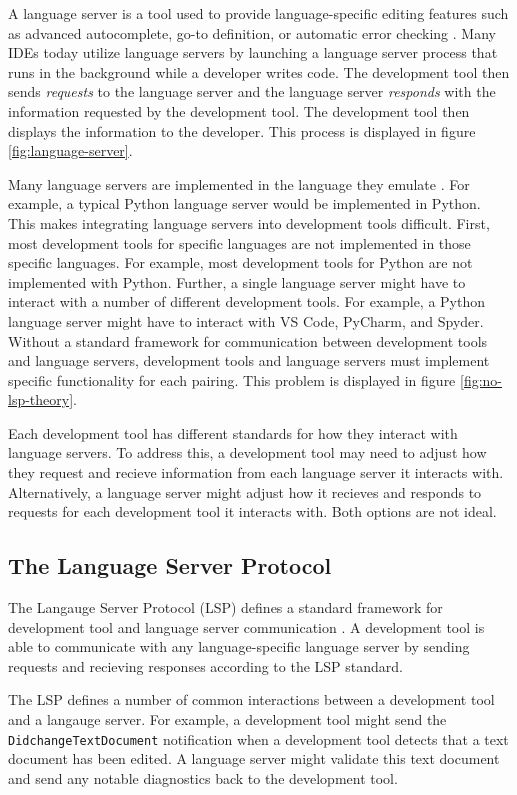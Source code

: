 \documentclass{article}
\begin{document}
A language server is a tool used to provide language-specific editing features such as advanced autocomplete, go-to definition, or automatic error checking \cite{Microsoft_2022a}. Many IDEs today utilize language servers by launching a language server process that runs in the background while a developer writes code. The development tool then sends \emph{requests} to the language server and the language server \emph{responds} with the information requested by the development tool. The development tool then displays the information to the developer. This process is displayed in figure \ref{fig:language-server}.

Many language servers are implemented in the language they emulate \cite{Microsoft_2023j}. For example, a typical Python language server would be implemented in Python. This makes integrating language servers into development tools difficult. First, most development tools for specific languages are not implemented in those specific languages. For example, most development tools for Python are not implemented with Python. Further, a single language server might have to interact with a number of different development tools. For example, a Python language server might have to interact with VS Code, PyCharm, and Spyder. Without a standard framework for communication between development tools and language servers, development tools and language servers must implement specific functionality for each pairing. This problem is displayed in figure \ref{fig:no-lsp-theory}. 

Each development tool has different standards for how they interact with language servers. To address this, a development tool may need to adjust how they request and recieve information from each language server it interacts with. Alternatively, a language server might adjust how it recieves and responds to requests for each development tool it interacts with. Both options are not ideal.

\subsection{The Language Server Protocol} 

The Langauge Server Protocol (LSP) defines a standard framework for development tool and language server communication \cite{Microsoft_2022a}. A development tool is able to communicate with any language-specific language server by sending requests and recieving responses according to the LSP standard. 

The LSP defines a number of common interactions between a development tool and a langauge server. For example, a development tool might send the \lstinline{DidchangeTextDocument} notification when a development tool detects that a text document has been edited. A language server might validate this text document and send any notable diagnostics back to the development tool. 
\end{document}
